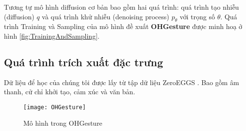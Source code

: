 Tương tự mô hình diffusion cơ bản bao gồm hai quá trình: quá trình tạo nhiễu (diffusion) $q$ và quá trình khử nhiễu (denoising process) $p_{\theta}$ với trọng số $\theta$. Quá trình Training và Sampling của mô hình đề xuất \textbf{OHGesture} được minh hoạ ở hình \ref{fig:TrainingAndSampling}.

\subsection{Quá trình trích xuất đặc trưng}

Dữ liệu để học của chúng tôi được lấy từ tập dữ liệu ZeroEGGS \cite{ghorbani2022zeroeggszeroshotexamplebasedgesture}. Bao gồm âm thanh, cử chỉ khởi tạo, cảm xúc và văn bản.
\begin{figure}[H]
	\centering
	\texttt{[image: OHGesture]}
	\caption{Mô hình trong OHGesture}
	\label{fig:OHGesture}
\end{figure}
\vspace{-10pt}

